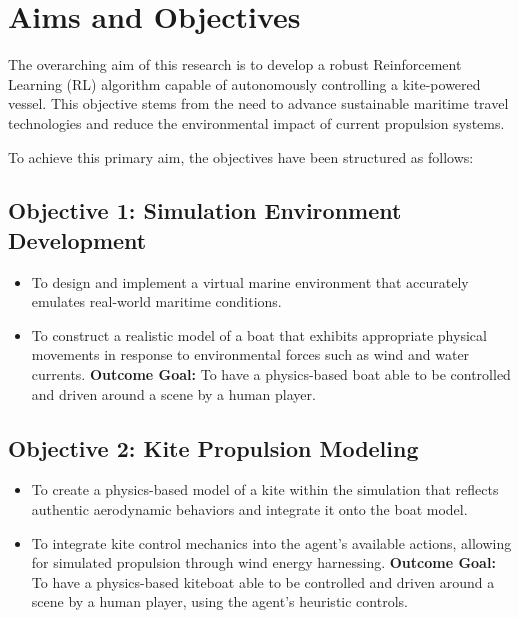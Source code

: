 

\section{Aims and Objectives}

The overarching aim of this research is to develop a robust Reinforcement Learning (RL) algorithm capable of autonomously controlling a kite-powered vessel. This objective stems from the need to advance sustainable maritime travel technologies and reduce the environmental impact of current propulsion systems.

To achieve this primary aim, the objectives have been structured as follows:

\subsection*{Objective 1: Simulation Environment Development}
\begin{itemize}
    \item To design and implement a virtual marine environment that accurately emulates real-world maritime conditions.
    \item To construct a realistic model of a boat that exhibits appropriate physical movements in response to environmental forces such as wind and water currents.
    \newline\textbf{Outcome Goal:} To have a physics-based boat able to be controlled and driven around a scene by a human player.
\end{itemize}

\subsection*{Objective 2: Kite Propulsion Modeling}
\begin{itemize}
    \item To create a physics-based model of a kite within the simulation that reflects authentic aerodynamic behaviors and integrate it onto the boat model.
    \item To integrate kite control mechanics into the agent’s available actions, allowing for simulated propulsion through wind energy harnessing.
    \newline\textbf{Outcome Goal:} To have a physics-based kiteboat able to be controlled and driven around a scene by a human player, using the agent's heuristic controls.
\end{itemize}

